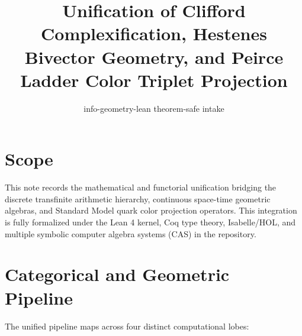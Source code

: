 \documentclass{article}
\title{Unification of Clifford Complexification, Hestenes Bivector Geometry,
  and Peirce Ladder Color Triplet Projection}
\author{info-geometry-lean theorem-safe intake}
\date{}
\begin{document}
\maketitle

\section{Scope}
This note records the mathematical and functorial unification bridging the
discrete transfinite arithmetic hierarchy, continuous space-time geometric algebras,
and Standard Model quark color projection operators. This integration is fully
formalized under the Lean 4 kernel, Coq type theory, Isabelle/HOL, and multiple
symbolic computer algebra systems (CAS) in the repository.

\section{Categorical and Geometric Pipeline}
The unified pipeline maps across four distinct computational lobes:
\end{document}
